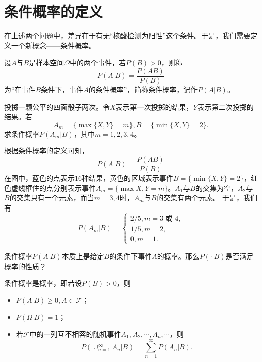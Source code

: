 \section{条件概率的定义}
在上述两个问题中，差异在于有无“核酸检测为阳性”这个条件。于是，我们需要定义一个新概念——条件概率。
\begin{definition}[条件概率] \label{def:int} 
设$A$与$B$是样本空间$\Omega$中的两个事件，若$P(B)> 0$，则称
$$P(A|B)=\frac{P(AB)}{P(B)} $$
为“在事件$B$条件下，事件$A$的条件概率”，简称条件概率，记作$P(A|B)$。
\end{definition}
\begin{example}
投掷一颗公平的四面骰子两次。令$X$表示第一次投掷的结果，$Y$表示第二次投掷的结果。若
$$
A_m = \{\max\{X,Y\} = m\}, B=\{\min\{X,Y\}=2\}.
$$
求条件概率$P(A_m|B)$，其中$m=1,2,3,4$。
\end{example}
\begin{solution}
    根据条件概率的定义可知，
    $$
    P(A|B) = \frac{P(AB)}{P(B)}
    $$
在图中，蓝色的点表示16种结果，黄色的区域表示事件$B = \{\min\{X,Y\}=2\}$，红色虚线框住的点分别表示事件$A_m = \{\max{X,Y} = m\}$。$A_1$与$B$的交集为空，$A_2$与$B$的交集只有一个元素，而当$m=3,4$时，$A_m$与$B$的交集有两个元素。
于是，我们有
$$
P(A_m|B) = \left\{
\begin{aligned}
    2/5 , m= 3 \text{ 或 } 4,\\
    1/5, m=2,\\
    0, m=1.
\end{aligned}
\right.
$$

\end{solution}
\begin{problem}
条件概率$P(A|B)$本质上是给定$B$的条件下事件$A$的概率。那么$P(\cdot|B)$是否满足概率的性质？
\end{problem}
\begin{theorem}
    条件概率是概率，即若设$P(B)>0$，则
    \begin{itemize}
        \item $P(A|B)\geq 0, A\in \mathcal{F}$；
        \item $P(\Omega|B)=1$；
        \item 若$\mathcal{F}$中的一列互不相容的随机事件$A_1,A_2,\cdots,A_n,\cdots$，则
        $$
        P(\cup_{n=1}^\infty A_n|B) = \sum_{n=1}^\infty P(A_n|B).
        $$
    \end{itemize}
\end{theorem}

